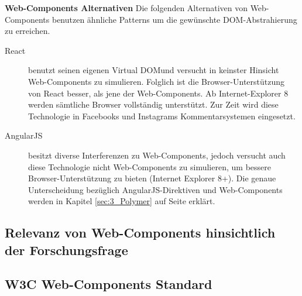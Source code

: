 \textbf{Web-Components Alternativen}
Die folgenden Alternativen von Web-Components benutzen ähnliche Patterns um die gewünschte DOM-Abstrahierung zu erreichen.
\begin{description}
\item[React] benutzt seinen eigenen \glqq Virtual DOM\grqq und versucht in keinster Hinsicht Web-Components zu simulieren. Folglich ist die Browser-Unterstützung von React besser, als jene der Web-Components. Ab Internet-Explorer 8 werden sämtliche Browser vollständig unterstützt. Zur Zeit wird diese Technologie in Facebooks und Instagrams Kommentarsystemen eingesetzt.
\item[AngularJS] besitzt diverse Interferenzen zu Web-Components, jedoch versucht auch diese Technologie nicht Web-Components zu simulieren, um bessere Browser-Unterstützung zu bieten (Internet Explorer 8+). Die genaue Unterscheidung bezüglich AngularJS-Direktiven und Web-Components werden in Kapitel \ref{sec:3_Polymer} auf Seite \pageref{sec:3_Polymer} erklärt.
\end{description}


\subsection{Relevanz von Web-Components hinsichtlich der Forschungsfrage}
\label{sec:3_Relevanz}

\subsection{W3C Web-Components Standard}
\label{sec:3_W3C}

